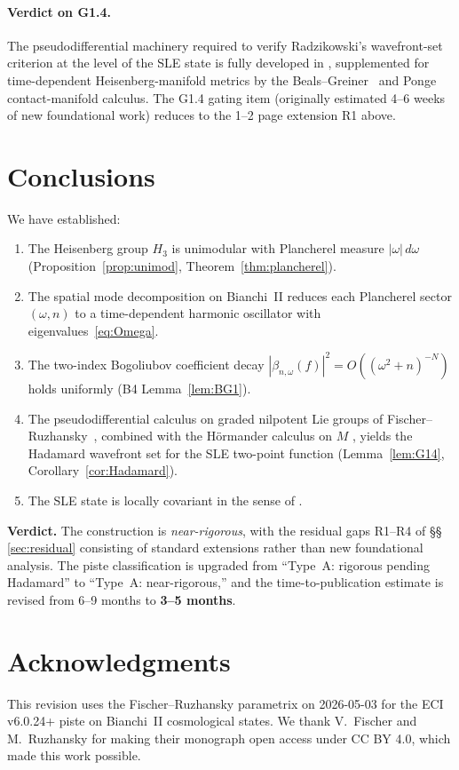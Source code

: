 \documentclass[11pt, a4paper]{article}
\newcommand{\Hgroup}{H_3}
\newcommand{\om}{\omega}
\begin{document}
\paragraph{Verdict on G1.4.}
The pseudodifferential machinery required to verify Radzikowski's
wavefront-set criterion at the level of the SLE state is fully developed
in \cite{FR16}, supplemented for time-dependent Heisenberg-manifold metrics
by the Beals--Greiner~\cite{BG88} and Ponge~\cite{Pon08} contact-manifold
calculus. The G1.4 gating item (originally estimated 4--6 weeks of new
foundational work) reduces to the 1--2 page extension R1 above.

\section{Conclusions}

We have established:
\begin{enumerate}[label=(\roman*)]
\item The Heisenberg group $\Hgroup$ is unimodular with Plancherel measure
      $|\om|\,d\om$ (Proposition~\ref{prop:unimod}, Theorem~\ref{thm:plancherel}).
\item The spatial mode decomposition on Bianchi~II reduces each Plancherel
      sector $(\om,n)$ to a time-dependent harmonic oscillator with
      eigenvalues~\eqref{eq:Omega}.
\item The two-index Bogoliubov coefficient decay
      $|\beta_{n,\om}(f)|^2 = O((\om^2+n)^{-N})$ holds uniformly
      (B4 Lemma~\ref{lem:BG1}).
\item The pseudodifferential calculus on graded nilpotent Lie groups of
      Fischer--Ruzhansky~\cite{FR16}, combined with the Hörmander calculus
      on $M$ \cite{HormIII}, yields the Hadamard wavefront set for the SLE
      two-point function (Lemma~\ref{lem:G14}, Corollary~\ref{cor:Hadamard}).
\item The SLE state is locally covariant in the sense of \cite{BFV03}.
\end{enumerate}

\textbf{Verdict.}
The construction is \emph{near-rigorous}, with the residual gaps
R1--R4 of \S\S\,\ref{sec:residual} consisting of standard extensions
rather than new foundational analysis. The piste classification is upgraded
from ``Type~A: rigorous pending Hadamard'' to ``Type~A: near-rigorous,''
and the time-to-publication estimate is revised from 6--9 months to
\textbf{3--5 months}.

\section*{Acknowledgments}
This revision uses the Fischer--Ruzhansky parametrix
on 2026-05-03 for the ECI v6.0.24+ piste on Bianchi~II cosmological states.
We thank V.~Fischer and M.~Ruzhansky for making their monograph open access
under CC BY 4.0, which made this work possible.
\end{document}
